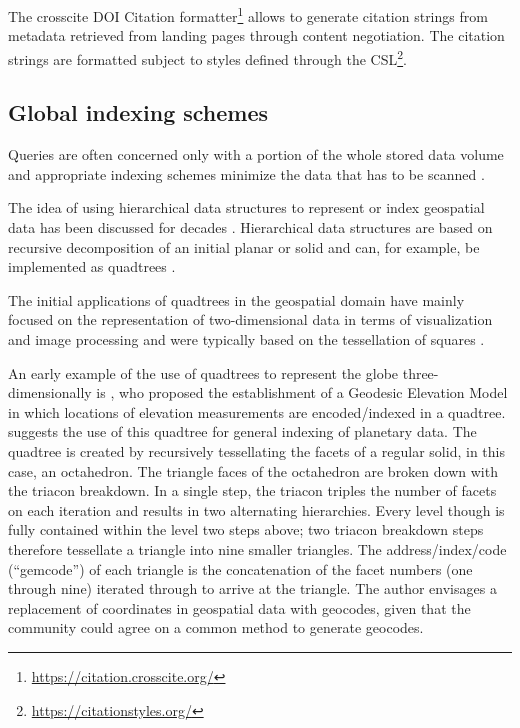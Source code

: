 \documentclass[letterpaper, parskip=half]{scrartcl}
\begin{document}
The crosscite DOI Citation formatter\footnote{\url{https://citation.crosscite.org/}} allows to generate citation strings from metadata retrieved from landing pages through content negotiation.
The citation strings are formatted subject to styles defined through the \gls{CSL}\footnote{\url{https://citationstyles.org/}}.

\newpage
\subsection{Global indexing schemes}


\label{lit_index}
Queries are often concerned only with a portion of the whole stored data volume and appropriate indexing schemes minimize the data that has to be scanned \citep{Kunszt2000}.

The idea of using hierarchical data structures to represent or index geospatial data has been discussed for decades \citep{Dutton1996, Samet1988}.
Hierarchical data structures are based on recursive decomposition of an initial planar or solid and can, for example, be implemented as quadtrees \citep{Samet1988}.

The initial applications of quadtrees in the geospatial domain have mainly focused on the representation of two-dimensional data in terms of visualization and image processing and were typically based on the tessellation of squares \citep{Lugo1995}.

An early example of the use of quadtrees to represent the globe three-dimensionally is \cite{Dutton1984}, who proposed the establishment of a Geodesic Elevation Model in which locations of elevation measurements are encoded/indexed in a quadtree. 
\cite{Dutton1989} suggests the use of this quadtree for general indexing of planetary data.
The quadtree is created by recursively tessellating the facets of a regular solid, in this case, an octahedron.
The triangle faces of the octahedron are broken down with the triacon breakdown. In a single step, the triacon triples the number of facets on each iteration and results in two alternating hierarchies. Every level though is fully contained within the level two steps above; two triacon breakdown steps therefore tessellate a triangle into nine smaller triangles. The address/index/code (``gemcode'') of each triangle is the concatenation of the facet numbers (one through nine) iterated through to arrive at the triangle. The author envisages a replacement of coordinates in geospatial data with geocodes, given that the community could agree on a common method to generate geocodes.
\end{document}
